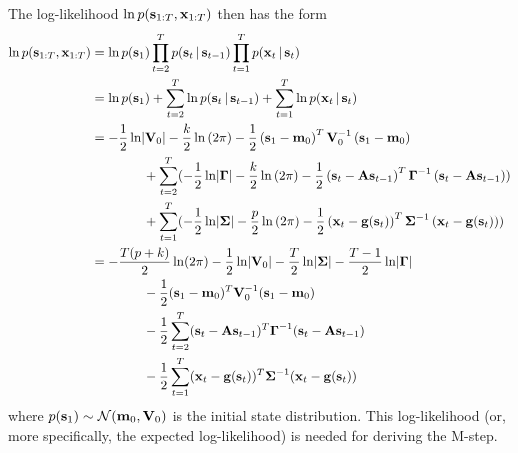 	The log-likelihood \( \ln p\paren{\vec{s}_{1:T}, \vec{x}_{1:T}} \) then has the form
	\begin{align*}
		\ln p\paren{\vec{s}_{1:T}, \vec{x}_{1:T}}
			&= \ln p\paren{\vec{s}_1} \prod_{t = 2}^{T} p\paren{\vec{s}_t \given \vec{s}_{t - 1}} \prod_{t = 1}^{T} p\paren{\vec{x}_t \given \vec{s}_t} \\
			&= \ln p\paren{\vec{s}_1} + \sum_{t = 2}^{T} \ln p\paren{\vec{s}_t \given \vec{s}_{t - 1}} + \sum_{t = 1}^{T} \ln p\paren{\vec{x}_t \given \vec{s}_t} \\
			&= \logGaussianMulti{\vec{s}_1}{\vec{m}_0}{\mat{V}_0}{k} \\
				&\qquad\qquad + \sum_{t = 2}^{T} \paren{ \logGaussianMulti{\vec{s}_t}{\mat{A}\vec{s}_{t - 1}}{\mat{\Gamma}}{k} } \\
				&\qquad\qquad + \sum_{t = 1}^{T} \paren{ \logGaussianMulti{\vec{x}_t}{\vec{g}\paren{\vec{s}_t}}{\mat{\Sigma}}{p} } \\
			&= -\frac{T \paren{p + k}}{2} \ln \paren{2\pi} - \frac{1}{2} \ln \Det{\mat{V}_0} - \frac{T}{2} \ln \Det{\mat{\Sigma}} - \frac{T - 1}{2} \ln \Det{\mat{\Gamma}} \\
				&\qquad\qquad -\frac{1}{2} \paren{\vec{s}_1 - \vec{m}_0}^T \mat{V}_0^{-1} \paren{\vec{s}_1 - \vec{m}_0} \\
				&\qquad\qquad -\frac{1}{2} \sum_{t = 2}^{T} \paren{\vec{s}_t - \mat{A}\vec{s}_{t - 1}}^T \mat{\Gamma}^{-1} \paren{\vec{s}_t - \mat{A}\vec{s}_{t - 1}} \\
				&\qquad\qquad -\frac{1}{2} \sum_{t = 1}^{T} \paren{\vec{x}_t - \vec{g}\paren{\vec{s}_t}}^T \mat{\Sigma}^{-1} \paren{\vec{x}_t - \vec{g}\paren{\vec{s}_t}}
	\end{align*}
	where \( p\paren{\vec{s}_1} \sim \normal\paren{\vec{m}_0, \mat{V}_0} \) is the initial state distribution. This log-likelihood (or, more specifically, the expected log-likelihood) is needed for deriving the M-step.

